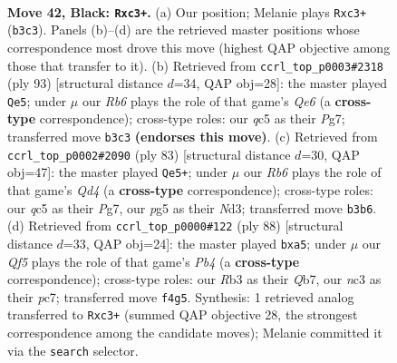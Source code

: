 \documentclass[11pt]{article}
\begin{document}
\clearpage

\begin{figure}[p]\centering
\begin{subfigure}{0.46\textwidth}\centering
\resizebox{\linewidth}{!}{%
\newchessgame
\chessboard[
  setfen={6k1/2p2p2/8/2Q3P1/2P1Pq2/1rN4K/8/8 b - - 4 42},
  showmover=false,
  pgfstyle=straightmove, color=movearrow, markmove={b3-c3}
]}
\caption{}
\end{subfigure}\hfill
\begin{subfigure}{0.46\textwidth}\centering
\resizebox{\linewidth}{!}{%
\newchessgame
\chessboard[
  setfen={7k/p5p1/7p/2p5/P1Q4P/2P1q1NK/8/8 b - - 4 47},
  showmover=false,
  pgfstyle=straightmove, color=movearrow, markmove={e3-e5}
]}
\caption{}
\end{subfigure}
\\[4pt]
\begin{subfigure}{0.46\textwidth}\centering
\resizebox{\linewidth}{!}{%
\newchessgame
\chessboard[
  setfen={7k/6p1/8/pp1q2P1/4N3/P2n1Q2/5P1K/8 b - - 0 42},
  showmover=false,
  pgfstyle=straightmove, color=movearrow, markmove={d5-e5}
]}
\caption{}
\end{subfigure}\hfill
\begin{subfigure}{0.46\textwidth}\centering
\resizebox{\linewidth}{!}{%
\newchessgame
\chessboard[
  setfen={8/1Qp2k2/4p3/p3q3/1P6/P7/2P5/1K6 w - - 1 45},
  showmover=false,
  pgfstyle=straightmove, color=movearrow, markmove={b4-a5}
]}
\caption{}
\end{subfigure}
\caption{\textbf{Move 42, Black: \texttt{Rxc3+}.} (a) Our position; Melanie plays \texttt{Rxc3+} (\texttt{b3c3}). Panels (b)--(d) are the retrieved master positions whose correspondence most drove this move (highest QAP objective among those that transfer to it). (b) Retrieved from \texttt{ccrl\_top\_p0003\#2318} (ply 93) [structural distance $d$=34, QAP obj=28]: the master played \texttt{Qe5}; under $\mu$ our \emph{Rb6} plays the role of that game's \emph{Qe6} (a \textbf{cross-type} correspondence); cross-type roles: our \emph{q}c5 as their \emph{P}g7; transferred move \texttt{b3c3} \textbf{(endorses this move)}. (c) Retrieved from \texttt{ccrl\_top\_p0002\#2090} (ply 83) [structural distance $d$=30, QAP obj=47]: the master played \texttt{Qe5+}; under $\mu$ our \emph{Rb6} plays the role of that game's \emph{Qd4} (a \textbf{cross-type} correspondence); cross-type roles: our \emph{q}c5 as their \emph{P}g7, our \emph{p}g5 as their \emph{N}d3; transferred move \texttt{b3b6}. (d) Retrieved from \texttt{ccrl\_top\_p0000\#122} (ply 88) [structural distance $d$=33, QAP obj=24]: the master played \texttt{bxa5}; under $\mu$ our \emph{Qf5} plays the role of that game's \emph{Pb4} (a \textbf{cross-type} correspondence); cross-type roles: our \emph{R}b3 as their \emph{Q}b7, our \emph{n}c3 as their \emph{p}c7; transferred move \texttt{f4g5}. Synthesis: 1 retrieved analog transferred to \texttt{Rxc3+} (summed QAP objective 28, the strongest correspondence among the candidate moves); Melanie committed it via the \texttt{search} selector.}
\label{fig:thought-m83}
\end{figure}
\end{document}
